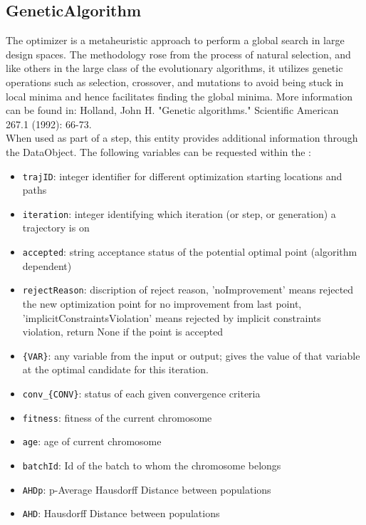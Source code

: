 \subsection{GeneticAlgorithm}
  The  optimizer is a metaheuristic approach
  to perform a global search in large design spaces. The methodology rose
  from the process of natural selection, and like others in the large class
  of the evolutionary algorithms, it utilizes genetic operations such as
  selection, crossover, and mutations to avoid being stuck in local minima
  and hence facilitates finding the global minima. More information can
  be found in:                             Holland, John H. "Genetic algorithms." Scientific
  American 267.1 (1992): 66-73.
\vspace{7pt} \\When used as part of a  step, this entity provides
        additional information through the  DataObject. The
        following variables can be requested within the :
        \begin{itemize}
          \item \texttt{trajID}: integer identifier for different optimization starting locations and paths
             \item \texttt{iteration}: integer identifying which iteration (or step, or generation) a trajectory is on
             \item \texttt{accepted}: string acceptance status of the potential optimal point (algorithm dependent)
             \item \texttt{rejectReason}: discription of reject reason, 'noImprovement' means rejected the new optimization point for no improvement from last point, 'implicitConstraintsViolation' means rejected by implicit constraints violation, return None if the point is accepted
             \item \texttt{\{VAR\}}: any variable from the  input or output; gives the value of that variable at the optimal candidate for this iteration.
             \item \texttt{conv\_\{CONV\}}: status of each given convergence criteria
             \item \texttt{fitness}: fitness of the current chromosome
             \item \texttt{age}: age of current chromosome
             \item \texttt{batchId}: Id of the batch to whom the chromosome belongs
             \item \texttt{AHDp}: p-Average Hausdorff Distance between populations
             \item \texttt{AHD}: Hausdorff Distance between populations
           
         \end{itemize}

